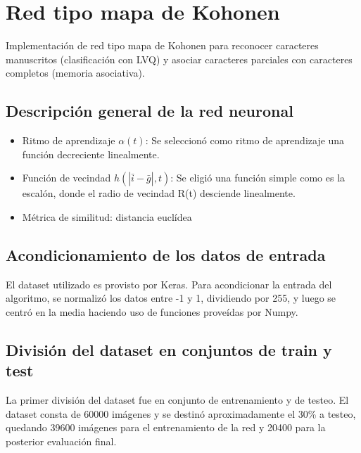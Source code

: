 \documentclass[
]{article}
\begin{document}
\hypertarget{red-tipo-mapa-de-kohonen}{%
\section{Red tipo mapa de Kohonen}\label{red-tipo-mapa-de-kohonen}}

Implementación de red tipo mapa de Kohonen para reconocer caracteres
manuscritos (clasificación con LVQ) y asociar caracteres parciales con
caracteres completos (memoria asociativa).

\hypertarget{descripciuxf3n-general-de-la-red-neuronal}{%
\subsection{Descripción general de la red
neuronal}\label{descripciuxf3n-general-de-la-red-neuronal}}

\begin{itemize}
\item
  Ritmo de aprendizaje \(\alpha(t)\): Se seleccionó como ritmo de
  aprendizaje una función decreciente linealmente.
\item
  Función de vecindad \(h(|\bar{i}-\bar{g}|, t)\): Se eligió una función
  simple como es la escalón, donde el radio de vecindad R(t) desciende
  linealmente.
\item
  Métrica de similitud: distancia euclídea
\end{itemize}

\hypertarget{acondicionamiento-de-los-datos-de-entrada}{%
\subsection{Acondicionamiento de los datos de
entrada}\label{acondicionamiento-de-los-datos-de-entrada}}

El dataset utilizado es provisto por Keras. Para acondicionar la entrada
del algoritmo, se normalizó los datos entre -1 y 1, dividiendo por 255,
y luego se centró en la media haciendo uso de funciones proveídas por
Numpy.

\hypertarget{divisiuxf3n-del-dataset-en-conjuntos-de-train-y-test}{%
\subsection{División del dataset en conjuntos de train y
test}\label{divisiuxf3n-del-dataset-en-conjuntos-de-train-y-test}}

La primer división del dataset fue en conjunto de entrenamiento y de
testeo. El dataset consta de 60000 imágenes y se destinó aproximadamente
el 30\% a testeo, quedando 39600 imágenes para el entrenamiento de la
red y 20400 para la posterior evaluación final.
\end{document}
